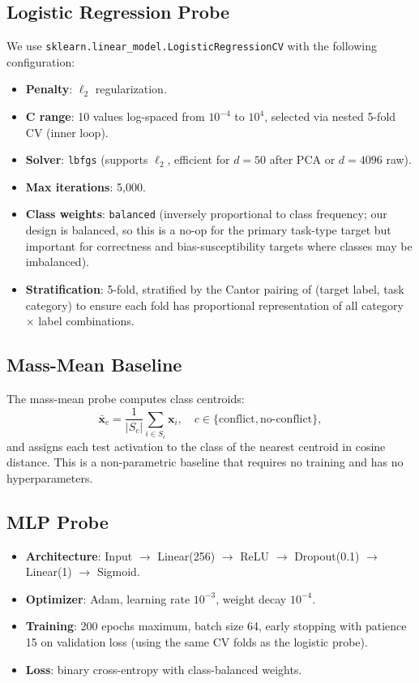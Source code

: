 \subsection{Logistic Regression Probe}

We use \texttt{sklearn.linear\_model.LogisticRegressionCV} with the
following configuration:
\begin{itemize}[leftmargin=*,itemsep=1pt]
  \item \textbf{Penalty}: $\ell_2$ regularization.
  \item \textbf{C range}: 10 values log-spaced from $10^{-4}$ to $10^{4}$,
  selected via nested 5-fold CV (inner loop).
  \item \textbf{Solver}: \texttt{lbfgs} (supports $\ell_2$, efficient for
  $d = 50$ after PCA or $d = 4096$ raw).
  \item \textbf{Max iterations}: 5{,}000.
  \item \textbf{Class weights}: \texttt{balanced} (inversely proportional
  to class frequency; our design is balanced, so this is a no-op for the
  primary task-type target but important for correctness and
  bias-susceptibility targets where classes may be imbalanced).
  \item \textbf{Stratification}: 5-fold, stratified by the Cantor pairing
  of (target label, task category) to ensure each fold has proportional
  representation of all category $\times$ label combinations.
\end{itemize}

\subsection{Mass-Mean Baseline}

The mass-mean probe computes class centroids:
\begin{equation}
  \bar{\mathbf{x}}_c = \frac{1}{|S_c|} \sum_{i \in S_c} \mathbf{x}_i,
  \quad c \in \{\text{conflict}, \text{no-conflict}\},
\end{equation}
and assigns each test activation to the class of the nearest centroid in
cosine distance.  This is a non-parametric baseline that requires no
training and has no hyperparameters.

\subsection{MLP Probe}

\begin{itemize}[leftmargin=*,itemsep=1pt]
  \item \textbf{Architecture}: Input $\to$ Linear(256) $\to$ ReLU $\to$
  Dropout(0.1) $\to$ Linear(1) $\to$ Sigmoid.
  \item \textbf{Optimizer}: Adam, learning rate $10^{-3}$, weight decay
  $10^{-4}$.
  \item \textbf{Training}: 200 epochs maximum, batch size 64, early
  stopping with patience 15 on validation loss (using the same CV folds
  as the logistic probe).
  \item \textbf{Loss}: binary cross-entropy with class-balanced weights.
\end{itemize}

